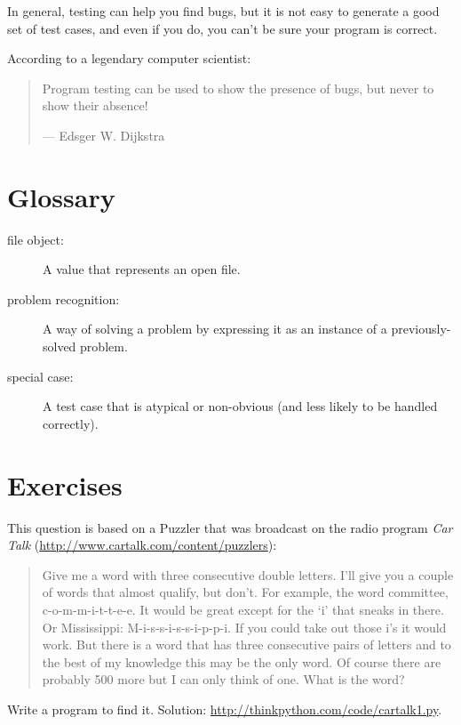 \documentclass[10pt]{book}
\begin{document}
In general, testing can help you find bugs, but it is not easy to
generate a good set of test cases, and even if you do, you can't
be sure your program is correct.

According to a legendary computer scientist:

\begin{quote}
Program testing can be used to show the presence of bugs, but never to
show their absence!

--- Edsger W. Dijkstra
\end{quote}


\section{Glossary}

\begin{description}

\item[file object:] A value that represents an open file.

\item[problem recognition:] A way of solving a problem by
expressing it as an instance of a previously-solved problem.

\item[special case:] A test case that is atypical or non-obvious
(and less likely to be handled correctly).

\end{description}


\section{Exercises}

\begin{exercise}

This question is based on a Puzzler that was broadcast on the radio
program {\em Car Talk} 
(\url{http://www.cartalk.com/content/puzzlers}):

\begin{quote}
Give me a word with three consecutive double letters. I'll give you a
couple of words that almost qualify, but don't. For example, the word
committee, c-o-m-m-i-t-t-e-e. It would be great except for the `i' that
sneaks in there. Or Mississippi: M-i-s-s-i-s-s-i-p-p-i. If you could
take out those i's it would work. But there is a word that has three
consecutive pairs of letters and to the best of my knowledge this may
be the only word. Of course there are probably 500 more but I can only
think of one. What is the word?
\end{quote}

Write a program to find it.  Solution: \url{http://thinkpython.com/code/cartalk1.py}.

\end{exercise}
\end{document}
